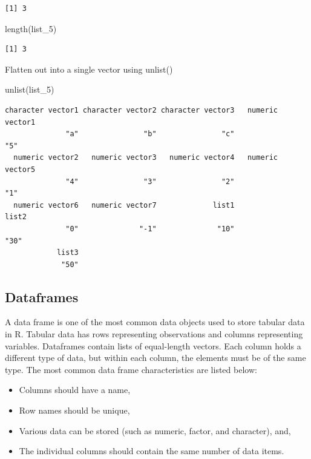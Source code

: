 \documentclass[
  letterpaper,
  DIV=11,
  numbers=noendperiod]{scrreprt}
\newenvironment{Shaded}{\begin{snugshade}}{\end{snugshade}}
\newcommand{\FunctionTok}[1]{\textcolor[rgb]{0.28,0.35,0.67}{#1}}
\newcommand{\NormalTok}[1]{\textcolor[rgb]{0.00,0.23,0.31}{#1}}
\providecommand{\tightlist}{%
  \setlength{\itemsep}{0pt}\setlength{\parskip}{0pt}}\usepackage{longtable,booktabs,array}
\begin{document}
\begin{verbatim}
[1] 3
\end{verbatim}

\begin{Shaded}
\begin{Highlighting}[]
\FunctionTok{length}\NormalTok{(list\_5)}
\end{Highlighting}
\end{Shaded}

\begin{verbatim}
[1] 3
\end{verbatim}

Flatten out into a single vector using unlist()

\begin{Shaded}
\begin{Highlighting}[]
\FunctionTok{unlist}\NormalTok{(list\_5)}
\end{Highlighting}
\end{Shaded}

\begin{verbatim}
character vector1 character vector2 character vector3   numeric vector1 
              "a"               "b"               "c"               "5" 
  numeric vector2   numeric vector3   numeric vector4   numeric vector5 
              "4"               "3"               "2"               "1" 
  numeric vector6   numeric vector7             list1             list2 
              "0"              "-1"              "10"              "30" 
            list3 
             "50" 
\end{verbatim}

\subsection{Dataframes}\label{dataframes}

A data frame is one of the most common data objects used to store
tabular data in R. Tabular data has rows representing observations and
columns representing variables. Dataframes contain lists of equal-length
vectors. Each column holds a different type of data, but within each
column, the elements must be of the same type. The most common data
frame characteristics are listed below:

\begin{itemize}
\tightlist
\item
  Columns should have a name,
\item
  Row names should be unique,
\item
  Various data can be stored (such as numeric, factor, and character),
  and,
\item
  The individual columns should contain the same number of data items.
\end{itemize}
\end{document}
